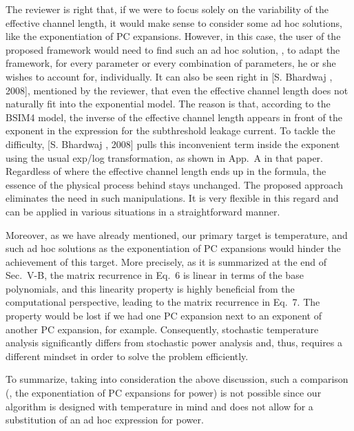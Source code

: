 \begin{authors}
The reviewer is right that, if we were to focus solely on the variability of the effective channel length, it would make sense to consider some ad hoc solutions, like the exponentiation of PC expansions.
However, in this case, the user of the proposed framework would need to find such an ad hoc solution, \ie, to adapt the framework, for every parameter or every combination of parameters, he or she wishes to account for, individually.
It can also be seen right in [S. Bhardwaj \etal, 2008], mentioned by the reviewer, that even the effective channel length does not naturally fit into the exponential model.
The reason is that, according to the BSIM4 model, the inverse of the effective channel length appears in front of the exponent in the expression for the subthreshold leakage current.
To tackle the difficulty, [S. Bhardwaj \etal, 2008] pulls this inconvenient term inside the exponent using the usual exp/log transformation, as shown in App.~A in that paper.
Regardless of where the effective channel length ends up in the formula, the essence of the physical process behind stays unchanged.
The proposed approach eliminates the need in such manipulations.
It is very flexible in this regard and can be applied in various situations in a straightforward manner.

Moreover, as we have already mentioned, our primary target is temperature, and such ad hoc solutions as the exponentiation of PC expansions would hinder the achievement of this target.
More precisely, as it is summarized at the end of Sec.~V-B, the matrix recurrence in Eq.~6 is linear in terms of the base polynomials, and this linearity property is highly beneficial from the computational perspective, leading to the matrix recurrence in Eq.~7.
The property would be lost if we had one PC expansion next to an exponent of another PC expansion, for example.
Consequently, stochastic temperature analysis significantly differs from stochastic power analysis and, thus, requires a different mindset in order to solve the problem efficiently.

To summarize, taking into consideration the above discussion, such a comparison (\ie, the exponentiation of PC expansions for power) is not possible since our algorithm is designed with temperature in mind and does not allow for a substitution of an ad hoc expression for power.



\end{authors}

